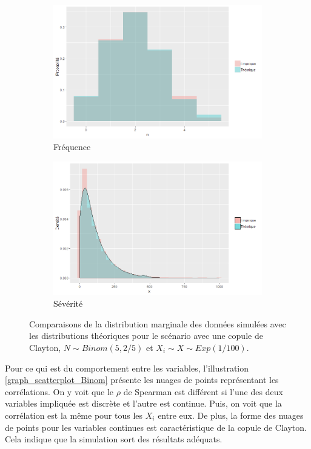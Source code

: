 \documentclass{article}
\begin{document}
	\begin{figure}[H]
	\begin{subfigure}[l]{0.5\textwidth}
		\includegraphics[width=\textwidth]{Graph/Clayton_Binom_N.png}
		\caption{Fréquence}
	\end{subfigure}
	\begin{subfigure}[r]{0.5\textwidth}
		\includegraphics[width=\textwidth]{Graph/Clayton_Binom_X.png}
		\caption{Sévérité}
	\end{subfigure}
	\caption{Comparaisons de la distribution marginale des données simulées avec les distributions théoriques pour le scénario avec une copule de Clayton, $N \sim Binom(5, 2/5)$ et $X_i \sim X \sim Exp(1/100)$.}
	\label{graph_densite_Binom}
	\end{figure}
	
	Pour ce qui est du comportement entre les variables, l'illustration \ref{graph_scatterplot_Binom} présente les nuages de points représentant les corrélations. On y voit que le $\rho$ de Spearman est différent si l'une des deux variables impliquée est discrète et l'autre est continue. Puis, on voit que la corrélation est la même pour tous les $X_i$ entre eux. De plus, la forme des nuages de points pour les variables continues est caractéristique de la copule de Clayton. Cela indique que la simulation sort des résultats adéquats.\\
	
\end{document}
